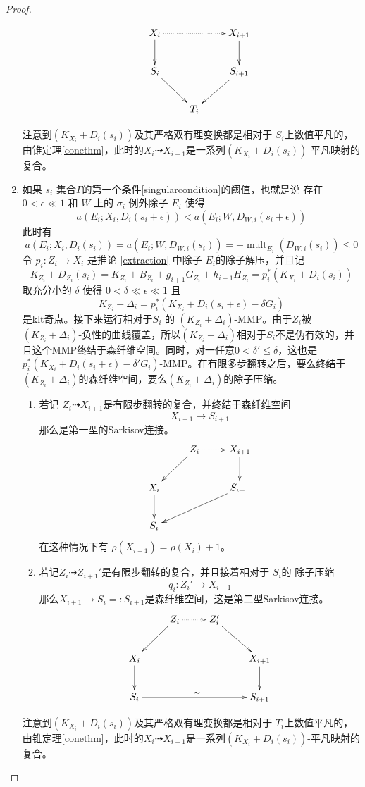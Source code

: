 \begin{proof}
\begin{enumerate}
\begin{enumerate}
      \[
        \xymatrix{
          X_{i}\ar@{.>}[rr]\ar[d]& &X_{i+1}\ar[d] \\
          S_{i}\ar[rd]& & S_{i+1}\ar[ld]\\
             &T_{i}&
        }
      \]
  \end{enumerate}
  注意到$ (K_{X_{i}}+D_{i}(s_{i})) $及其严格双有理变换都是相对于 $S_{i}$上数值平凡的，由锥定理\ref{conethm}，此时的$X_{i}\dashrightarrow X_{i+1}$是一系列$ (K_{X_{i}}+D_{i}(s_{i}))$-平凡映射的复合。
    \item 如果 $s_{i}$ 集合$\Gamma$的第一个条件\ref{singularcondition}的阈值，也就是说 存在  $0<\epsilon \ll 1$ 和 $W$ 上的  $\sigma_{i}$-例外除子 $E_{i}$ 使得
  \[ a(E_{i};X_{i},D_{i}(s_{i}+\epsilon))< a(E_{i};W,D_{W,i}(s_{i}+\epsilon)) \]
  此时有
  \[ a(E_{i};X_{i},D_{i}(s_{i}))= a(E_{i};W,D_{W,i}(s_{i}))=-\operatorname{mult}_{E_{i}}(D_{W,i}(s_{i}))\leqslant 0 \]
  令 $p_{i}:Z_{i}\to X_{i}$ 是推论 \ref{extraction} 中除子 $E_{i}$的除子解压，并且记
  \[K_{Z_{i}}+D_{Z_{i}}(s_{i})=K_{Z_{i}}+B_{Z_{i}}+g_{i+1}G_{Z_{i}}+h_{i+1}H_{Z_{i}}=p_{i}^*\left(K_{X_{i}}+D_{i}\left(s_{i}\right)\right)\]
  取充分小的 $\delta$ 使得 $0<\delta \ll \epsilon \ll 1$ 且
  \[ K_{Z_{i}}+\Delta_{i}=p_{i}^*(K_{X_{i}}+D_{i}(s_{i}+\epsilon)-\delta G_{i}) \]
  是klt奇点。接下来运行相对于$S_{i}$ 的 $(K_{Z_{i}}+\Delta_{i})$-MMP。由于$Z_{i}$被$(K_{Z_{i}}+\Delta_{i})$-负性的曲线覆盖，所以$(K_{Z_{i}}+\Delta_{i})$相对于$S_{i}$不是伪有效的，并且这个MMP终结于森纤维空间。同时，对一任意$0<\delta'\leqslant\delta$，这也是$p_{i}^*(K_{X_{i}}+D_{i}(s_{i}+\epsilon)-\delta'G_{i})$-MMP。在有限多步翻转之后，要么终结于$(K_{Z_{i}}+\Delta_{i})$的森纤维空间，要么$(K_{Z_{i}}+\Delta_{i})$的除子压缩。
  \begin{enumerate}
    \item 若记 $Z_{i}\dashrightarrow X_{i+1}$是有限步翻转的复合，并终结于森纤维空间
      \[X_{i+1}\to S_{i+1}\]
      那么是第一型的Sarkisov连接。 
      \[
        \xymatrix{
        &Z_{i}\ar@{.>}[r]\ar[ld] &X_{i+1}\ar[d] \\
          X_{i}\ar[d]& &S_{i+1}\ar[lld]\\
          S_{i}   & &
        }
      \]
      在这种情况下有 $\rho(X_{i+1})=\rho(X_{i})+1$。
    \item 若记$Z_{i}\dashrightarrow Z_{i+1}'$是有限步翻转的复合，并且接着相对于 $S_{i}$的 除子压缩
      \[q_{i}:Z_{i}'\to X_{i+1}\]
     那么$X_{i+1}\to S_{i}=:S_{i+1}$是森纤维空间，这是第二型Sarkisov连接。
      \[
        \xymatrix{
        &Z_{i}\ar@{.>}[r]\ar[ld] &Z_{i}'\ar[rd] \\
          X_{i}\ar[d]& & &X_{i+1}\ar[d]\\
          S_{i}\ar[rrr]^{\sim}   & & & S_{i+1}
        }
      \]
  \end{enumerate}
  注意到$ (K_{X_{i}}+D_{i}(s_{i})) $及其严格双有理变换都是相对于 $T_{i}$上数值平凡的，由锥定理\ref{conethm}，此时的$X_{i}\dashrightarrow X_{i+1}$是一系列$ (K_{X_{i}}+D_{i}(s_{i}))$-平凡映射的复合。
\end{enumerate}
\end{proof}
